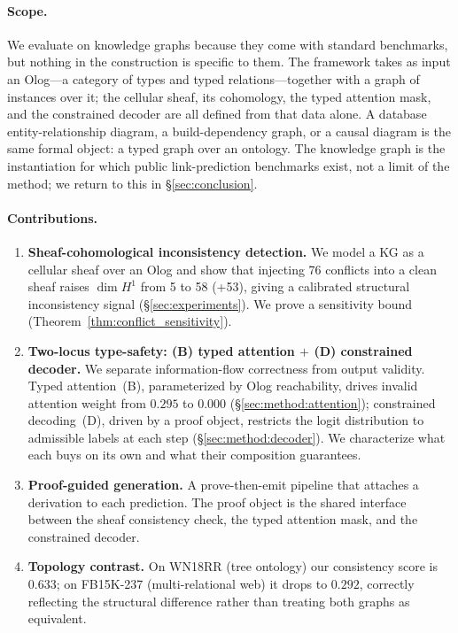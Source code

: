 \paragraph{Scope.} We evaluate on knowledge graphs because they come with
standard benchmarks, but nothing in the construction is specific to them.
The framework takes as input an Olog---a category of types and typed
relations---together with a graph of instances over it; the cellular
sheaf, its cohomology, the typed attention mask, and the constrained
decoder are all defined from that data alone. A database
entity-relationship diagram, a build-dependency graph, or a causal
diagram is the same formal object: a typed graph over an ontology. The
knowledge graph is the instantiation for which public link-prediction
benchmarks exist, not a limit of the method; we return to this in
\S\ref{sec:conclusion}.

\paragraph{Contributions.}
\begin{enumerate}
\item \textbf{Sheaf-cohomological inconsistency detection.} We model a KG
as a cellular sheaf over an Olog and show that injecting 76 conflicts
into a clean sheaf raises $\dim H^1$ from 5 to 58 (+53), giving a
calibrated structural inconsistency signal (\S\ref{sec:experiments}).
We prove a sensitivity bound (Theorem~\ref{thm:conflict_sensitivity}).
\item \textbf{Two-locus type-safety: (B) typed attention $+$ (D)
constrained decoder.} We separate information-flow correctness from
output validity. Typed attention~(B), parameterized by Olog
reachability, drives invalid attention weight from $0.295$ to $0.000$
(\S\ref{sec:method:attention}); constrained decoding~(D), driven by a
proof object, restricts the logit distribution to admissible labels at
each step (\S\ref{sec:method:decoder}). We characterize what each buys
on its own and what their composition guarantees.
\item \textbf{Proof-guided generation.} A prove-then-emit pipeline that
attaches a derivation to each prediction. The proof object is the
shared interface between the sheaf consistency check, the typed
attention mask, and the constrained decoder.
\item \textbf{Topology contrast.} On WN18RR (tree ontology) our
consistency score is $0.633$; on FB15K-237 (multi-relational web) it
drops to $0.292$, correctly reflecting the structural difference rather
than treating both graphs as equivalent.
\end{enumerate}

